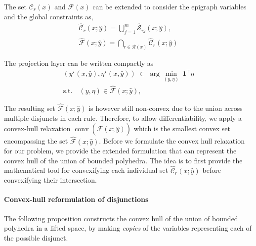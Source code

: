 \documentclass{article}
\theoremstyle{plain}
\theoremstyle{definition}
\theoremstyle{remark}
\begin{document}
The set $\mathcal{C}_r(x)$ and $\mathcal{F}(x)$ can be extended to consider the epigraph variables and the global constraints as,
\begin{equation}
\begin{aligned}
    \widehat{\mathcal{C}}_r(x;\hat y) =
    \bigcup_{j=1}^{m} \widehat{\mathcal{S}}_{rj}(x;\hat y), \\
    \widehat{\mathcal{F}}(x;\hat y) = \bigcap_{r \in \mathcal{R}(x)} \widehat{\mathcal{C}}_r(x;\hat y)
\end{aligned}
\label{eq:lifted_consequent}
\end{equation}

The projection layer can be written compactly as
\begin{equation}
\begin{aligned}
    (y^\star(x,\hat{y}),\eta^\star(x,\hat{y}))
\;\in\;
\arg\min_{(y,\eta)}\ \mathbf{1}^\top \eta \\
\text{s.t.}\quad
(y,\eta)\in \widehat{\mathcal{F}}(x;\hat y),
\end{aligned}
\label{eq:lifted_projection}
\end{equation}

The resulting set $\widehat{\mathcal{F}}(x;\hat y)$ is however still non-convex due to the union across multiple disjuncts in each rule. Therefore, to allow differentiability, we apply a convex-hull relaxation $\operatorname{conv}(\widehat{\mathcal{F}}(x;\hat y))$ which is the smallest convex set encompassing the set $\widehat{\mathcal{F}}(x;\hat y)$. Before we formulate the convex hull relaxation for our problem, we provide the extended formulation that can represent the convex hull of the union of bounded polyhedra. The idea is to first provide the mathematical tool for convexifying each individual set $\widehat{\mathcal{C}}_r(x;\hat y)$ before convexifying their intersection.

\paragraph{Convex-hull reformulation of disjunctions}
The following proposition constructs the convex hull of the union of bounded polyhedra in a lifted space, by making \emph{copies} of the variables representing each of the possible disjunct.
\end{document}

